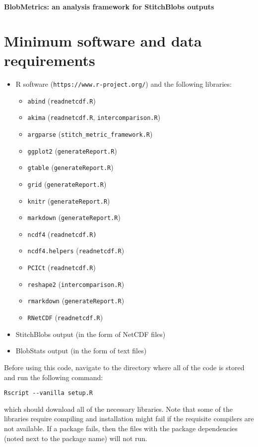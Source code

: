 \documentclass{article}
\begin{document}
{\Huge \textbf{BlobMetrics: an analysis framework for StitchBlobs outputs}}
\tableofcontents

\pagebreak

\section{Minimum software and data requirements}
\begin{itemize}
\item R software (\texttt{https://www.r-project.org/}) and the following libraries:
\begin{itemize}
\item \texttt{abind} (\texttt{readnetcdf.R})
\item \texttt{akima} (\texttt{readnetcdf.R}, \texttt{intercomparison.R})
\item \texttt{argparse} (\texttt{stitch\_metric\_framework.R})
\item \texttt{ggplot2} (\texttt{generateReport.R})
\item \texttt{gtable} (\texttt{generateReport.R})
\item \texttt{grid} (\texttt{generateReport.R})
\item \texttt{knitr} (\texttt{generateReport.R})
\item \texttt{markdown} (\texttt{generateReport.R})
\item \texttt{ncdf4} (\texttt{readnetcdf.R)}
\item \texttt{ncdf4.helpers} (\texttt{readnetcdf.R})
\item \texttt{PCICt} (\texttt{readnetcdf.R})
\item \texttt{reshape2} (\texttt{intercomparison.R})
\item \texttt{rmarkdown} (\texttt{generateReport.R})
\item \texttt{RNetCDF} (\texttt{readnetcdf.R})
\end{itemize}
\item StitchBlobs output (in the form of NetCDF files)
\item BlobStats output (in the form of text files)
\end{itemize}

Before using this code, navigate to the directory where all of the code is stored and run the following command:

\begin{verbatim}
Rscript --vanilla setup.R
\end{verbatim}

which should download all of the necessary libraries. Note that some of the libraries require compiling and installation might fail if the requisite compilers are not available. If a package fails, then the files with the package dependencies (noted next to the package name) will not run. 
\end{document}
